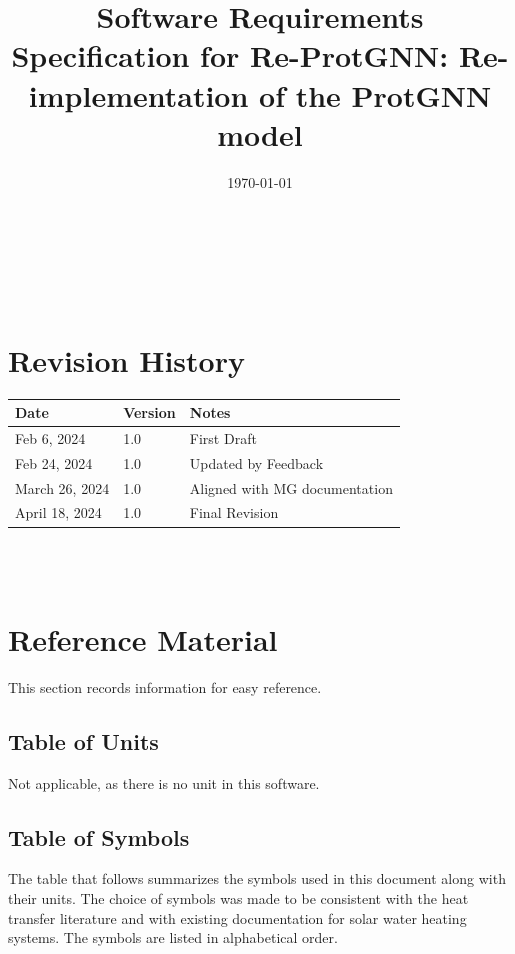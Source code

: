 \documentclass[12pt]{article}
\begin{document}
\title{Software Requirements Specification for Re-ProtGNN: Re-implementation of the ProtGNN model} 
\author{\authname}
\date{\today}
	
\maketitle

~\newpage


\tableofcontents

~\newpage

\section*{Revision History}

\begin{tabularx}{\textwidth}{p{3cm}p{2cm}X}
\toprule {\bf Date} & {\bf Version} & {\bf Notes}\\
\midrule
Feb 6, 2024 & 1.0 & First Draft\\
Feb 24, 2024 & 1.0 & Updated by Feedback\\
March 26, 2024 & 1.0 & Aligned with MG documentation\\
April 18, 2024 & 1.0 & Final Revision\\
\bottomrule
\end{tabularx}

~\\

~\newpage

\section{Reference Material}

This section records information for easy reference.

\subsection{Table of Units}
Not applicable, as there is no unit in this software.

\subsection{Table of Symbols}

The table that follows summarizes the symbols used in this document along with
their units.  The choice of symbols was made to be consistent with the heat
transfer literature and with existing documentation for solar water heating
systems.  The symbols are listed in alphabetical order.
\end{document}
